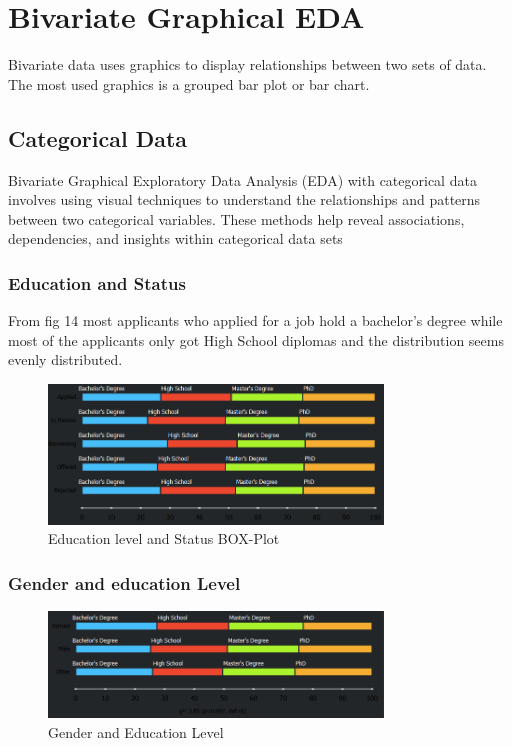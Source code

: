 \documentclass[lettersize,journal]{IEEEtran}
\begin{document}
\section{Bivariate Graphical EDA}

Bivariate data uses graphics to display relationships
between two sets of data. The most used graphics is a grouped
bar plot or bar chart.

\subsection{Categorical Data}
Bivariate Graphical Exploratory Data Analysis (EDA) with categorical data involves using visual techniques to understand the relationships and patterns between two categorical variables.
These methods help reveal associations, dependencies, and insights within categorical data sets

\vspace{5mm}

\subsubsection{Education and Status }
 From fig 14 most applicants who applied for a job
hold a bachelor's degree while most of the applicants only got
High School diplomas and the distribution seems evenly
distributed.
\vspace{5mm}
\begin{figure}[h]
\centering
\includegraphics[width=3.5in]{Screenshot 2023-09-08 175042.png}
\caption{Education level and Status BOX-Plot}
\label{fig_14}
\end{figure}
 
\vspace{5mm}
\subsubsection{Gender and education Level}

\begin{figure}[h]
\centering
\includegraphics[width=3.5in]{Screenshot 2023-09-08 175337.png}
\caption{Gender and Education Level}
\label{fig_14}
\end{figure}
\end{document}
